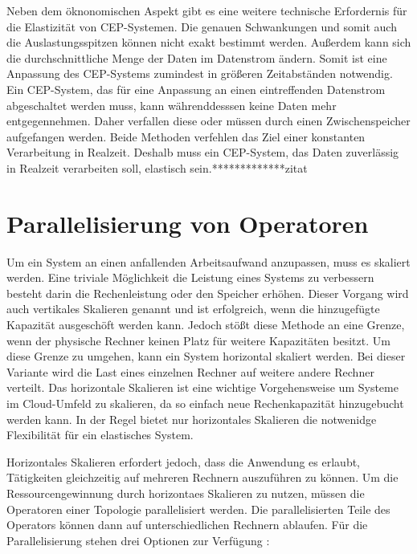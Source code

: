 Neben dem öknonomischen Aspekt gibt es eine weitere technische Erfordernis für die Elastizität von CEP-Systemen.
Die genauen Schwankungen und somit auch die Auslastungsspitzen können nicht exakt bestimmt werden.
Außerdem kann sich die durchschnittliche Menge der Daten im Datenstrom ändern.
Somit ist eine Anpassung des CEP-Systems zumindest in größeren Zeitabständen notwendig.
Ein CEP-System, das für eine Anpassung an einen eintreffenden Datenstrom abgeschaltet werden muss, kann währenddesssen keine Daten mehr entgegennehmen.
Daher verfallen diese oder müssen durch einen Zwischenspeicher aufgefangen werden.
Beide Methoden verfehlen das Ziel einer konstanten Verarbeitung in Realzeit.
Deshalb muss ein CEP-System, das Daten zuverlässig in Realzeit verarbeiten soll, elastisch sein.*************zitat

\section{Parallelisierung von Operatoren}

Um ein System an einen anfallenden Arbeitsaufwand anzupassen, muss es skaliert werden.
Eine triviale Möglichkeit die Leistung eines Systems zu verbessern besteht darin die Rechenleistung oder den Speicher erhöhen.
Dieser Vorgang wird auch vertikales Skalieren genannt und ist erfolgreich, wenn die hinzugefügte Kapazität ausgeschöft werden kann.
Jedoch stößt diese Methode an eine Grenze, wenn der physische Rechner keinen Platz für weitere Kapazitäten besitzt.
Um diese Grenze zu umgehen, kann ein System horizontal skaliert werden.
Bei dieser Variante wird die Last eines einzelnen Rechner auf weitere andere Rechner verteilt.
Das horizontale Skalieren ist eine wichtige Vorgehensweise um Systeme im Cloud-Umfeld zu skalieren, da so einfach neue Rechenkapazität hinzugebucht werden kann.
In der Regel bietet nur horizontales Skalieren die notwenidge Flexibilität für ein elastisches System.

Horizontales Skalieren erfordert jedoch, dass die Anwendung es erlaubt, Tätigkeiten gleichzeitig auf mehreren Rechnern auszuführen zu können.
Um die Ressourcengewinnung durch horizontaes Skalieren zu nutzen, müssen die Operatoren einer Topologie parallelisiert werden.
Die parallelisierten Teile des Operators können dann auf unterschiedlichen Rechnern ablaufen.
Für die Parallelisierung stehen drei Optionen zur Verfügung \cite{de_assuncao_distributed_2017}:


